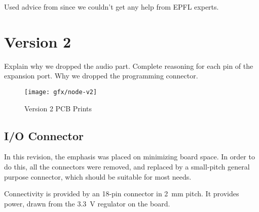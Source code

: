 Used advice from \cite{DropoutGuide} since we couldn't get any help from EPFL
experts.


\section{Version 2}

Explain why we dropped the audio part.
Complete reasoning for each pin of the expansion port.
Why we dropped the programming connector.

\begin{figure}[htb]
  \begin{center}
    \texttt{[image: gfx/node-v2]}
  \end{center}
  \caption{Version 2 PCB Prints}
  \label{fig:v2-prints}
\end{figure}

\subsection{I/O Connector}\label{sub:io-connector}

In this revision, the emphasis was placed on minimizing board space. In order to
do this, all the connectors were removed, and replaced by a small-pitch general
purpose connector, which should be suitable for most needs.

Connectivity is provided by an 18-pin connector in \SI{2}{mm} pitch. It provides
power, drawn from the \SI{3.3}{V} regulator on the board. 

